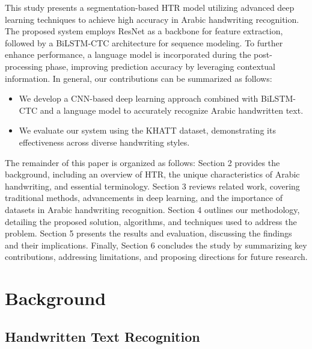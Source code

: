\documentclass[conference]{IEEEtran}
\newcounter{customsubsubsection} %
\let\oldsubsection\subsection
\renewcommand{\subsection}[1]{%
  \oldsubsection{#1}%
  \setcounter{customsubsubsection}{0}%
}
\begin{document}
This study presents a segmentation-based HTR model utilizing advanced deep learning techniques to achieve high accuracy in Arabic handwriting recognition. The proposed system employs ResNet as a backbone for feature extraction, followed by a BiLSTM-CTC architecture for sequence modeling. To further enhance performance, a language model is incorporated during the post-processing phase, improving prediction accuracy by leveraging contextual information. In general, our contributions can be summarized as follows:


\begin{itemize}
    \item We develop a CNN-based deep learning approach combined with BiLSTM-CTC and a language model to accurately recognize Arabic handwritten text.
    \item We evaluate our system using the KHATT dataset, demonstrating its effectiveness across diverse handwriting styles.
\end{itemize}

The remainder of this paper is organized as follows: Section 2 provides the background, including an overview of HTR, the unique characteristics of Arabic handwriting, and essential terminology. Section 3 reviews related work, covering traditional methods, advancements in deep learning, and the importance of datasets in Arabic handwriting recognition. Section 4 outlines our methodology, detailing the proposed solution, algorithms, and techniques used to address the problem. Section 5 presents the results and evaluation, discussing the findings and their implications. Finally, Section 6 concludes the study by summarizing key contributions, addressing limitations, and proposing directions for future research.


\section{Background}











\subsection{Handwritten Text Recognition}
\end{document}
